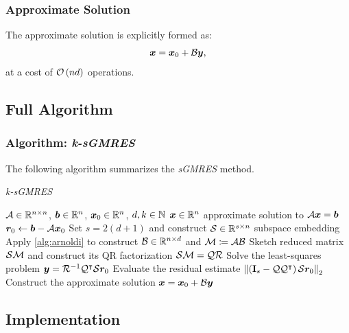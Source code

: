 \begin{frame}
    \frametitle{Approximate Solution}

    The approximate solution is explicitly formed as:
    \begin{align}
        \bm{x} = \bm{x}_0 + \mathcal{B} \bm{y},
    \end{align}
    at a cost of $\mathcal{O} \left( n d \right)$ operations.
\end{frame}

\subsection{Full Algorithm}

\begin{frame}[fragile]
    \frametitle{Algorithm: \textit{k-sGMRES}}

    The following algorithm summarizes the \textit{sGMRES} method.

    \begin{algorithm}[H]
    \caption{\textit{k-sGMRES}} \label{alg:sgmres}
    \begin{algorithmic}
    \Require $\mathcal{A} \in \mathbb{R}^{n \times n}$, $\bm{b} \in \mathbb{R}^{n}$, $\bm{x}_0 \in \mathbb{R}^{n}$, $d, k \in \mathbb{N}$
    \Ensure $\bm{x} \in \mathbb{R}^{n}$ approximate solution to $\mathcal{A} \bm{x} = \bm{b}$
    \State $\bm{r}_0 \gets \bm{b} - \mathcal{A} \bm{x}_0$
    \State Set $s = 2 (d + 1)$ and construct $\mathcal{S} \in \mathbb{R}^{s \times n}$ subspace embedding
    \State Apply \cref{alg:arnoldi} to construct $\mathcal{B} \in \mathbb{R}^{n \times d}$ and $\mathcal{M} \coloneqq \mathcal{A} \mathcal{B}$
    \State Sketch reduced matrix $\mathcal{S} \mathcal{M}$ and construct its QR factorization $\mathcal{S} \mathcal{M} = \mathcal{Q} \mathcal{R}$
    \State Solve the least-squares problem $\bm{y} = \mathcal{R}^{-1} \mathcal{Q}^{\intercal} \mathcal{S} \bm{r}_0$
    \State Evaluate the residual estimate $\left\lVert  \left( \mathbf{I}_s - \mathcal{Q} \mathcal{Q}^{\intercal} \right) \mathcal{S} \bm{r}_0  \right\rVert_2$
    \State Construct the approximate solution $\bm{x} = \bm{x}_0 + \mathcal{B} \bm{y}$
    \end{algorithmic}
    \end{algorithm}

\end{frame}

\subsection{Implementation}

